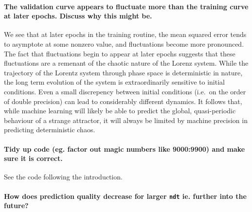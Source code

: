 \documentclass[11pt]{article}
\begin{document}
\hypertarget{the-validation-curve-appears-to-fluctuate-more-than-the-training-curve-at-later-epochs.-discuss-why-this-might-be.}{%
\paragraph{The validation curve appears to fluctuate more than the
training curve at later epochs. Discuss why this might
be.}\label{the-validation-curve-appears-to-fluctuate-more-than-the-training-curve-at-later-epochs.-discuss-why-this-might-be.}}

    We see that at later epochs in the training routine, the mean squared
error tends to asymptote at some nonzero value, and fluctuations become
more pronounced. The fact that fluctuations begin to appear at later
epochs suggests that these fluctuations are a remenant of the chaotic
nature of the Lorenz system. While the trajectory of the Lorentz system
through phase space is deterministic in nature, the long term evolution
of the system is extraordinarily sensitive to initial conditions. Even a
small discrepency between initial conditions (i.e.~on the order of
double precision) can lead to considerably different dynamics. It
follows that, while machine learning will likely be able to predict the
global, quasi-periodic behaviour of a strange attractor, it will always
be limited by machine precision in predicting deterministic chaos.

    \hypertarget{tidy-up-code-eg.-factor-out-magic-numbers-like-90009900-and-make-sure-it-is-correct.}{%
\paragraph{Tidy up code (eg. factor out magic numbers like 9000:9900)
and make sure it is
correct.}\label{tidy-up-code-eg.-factor-out-magic-numbers-like-90009900-and-make-sure-it-is-correct.}}

    See the code following the introduction.

    \hypertarget{how-does-prediction-quality-decrease-for-larger-ndt-ie.-further-into-the-future}{%
\paragraph{\texorpdfstring{How does prediction quality decrease for
larger \texttt{ndt} ie. further into the
future?}{How does prediction quality decrease for larger ndt ie. further into the future?}}\label{how-does-prediction-quality-decrease-for-larger-ndt-ie.-further-into-the-future}}
\end{document}
